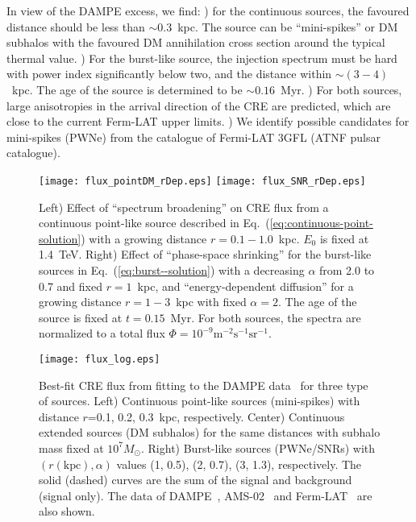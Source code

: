 \documentclass[aps,prl,twocolumn,a4paper]{revtex4}
\newcommand{\eq}[1]{Eq.~(\ref{#1})}
\newcommand{\tx}[1]{\text{#1}}
\begin{document}
In view of the DAMPE excess, we find: 
)
for the continuous sources, 
the favoured distance should be less than $\sim 0.3$~kpc.
The source can be  ``mini-spikes'' or DM subhalos  with 
the favoured DM annihilation cross section around the typical thermal value.
)
For the burst-like source, 
the injection spectrum must be hard with power index significantly below two, and
the distance within $\sim(3-4)$~kpc. 
The age of the source is determined to be $\sim0.16$~Myr.
) 
For both sources,
large anisotropies in the arrival direction of the CRE are predicted,
which are close to the current Ferm-LAT upper limits.
) 
We identify possible candidates for  mini-spikes (PWNe)
from the catalogue of Fermi-LAT  3GFL 
(ATNF pulsar catalogue).
\begin{figure}[thb]
	\centering
	\texttt{[image: flux\_pointDM\_rDep.eps]}
	\texttt{[image: flux\_SNR\_rDep.eps]}
	\caption{		
		Left) 
		Effect of  ``spectrum broadening'' on CRE flux from 
		a continuous point-like source described in 
		\eq{eq:continuous-point-solution} with a growing distance $r=0.1-1.0$~kpc.		 
		$E_{0}$ is fixed at 1.4~TeV.
		Right)
		Effect of ``phase-space shrinking'' for the burst-like sources in 
		\eq{eq:burst--solution} with  a decreasing $\alpha$ from 2.0 to 0.7 and fixed $r=1$~kpc,
		and ``energy-dependent diffusion''  for  a growing  distance $r=1-3$~kpc with fixed $\alpha=2$.
		The age of the source is  fixed at $t=0.15$~Myr.
		For both sources, the spectra are normalized to a total flux
		$\Phi=10^{-9}\mbox{m}^{-2}\mbox{s}^{-1}\mbox{sr}^{-1}$.
	}\label{fig:spectral-feature}
\end{figure}
\begin{figure*}[htb]
	\centering
	\texttt{[image: flux\_log.eps]}
	\caption{
		Best-fit CRE flux from fitting to the DAMPE data~\cite{Chang:2017xx}  
		for three type of sources.
		Left) Continuous point-like sources (mini-spikes) with distance $r$=0.1, 0.2, 0.3~kpc, 				respectively.
		Center) Continuous extended sources (DM subhalos) for the same distances with subhalo
		mass fixed at $10^{7}M_{\odot}$.
		Right) Burst-like sources (PWNe/SNRs) with $(r (\tx{kpc}),\alpha)$ values 
		(1, 0.5), 
		(2, 0.7), 
		(3, 1.3),			
		respectively.	
		The solid (dashed) curves are  the sum of the signal and background (signal only).
		The data of  DAMPE~\cite{Chang:2017xx},
		AMS-02~\cite{Aguilar:2014fea} and
		Ferm-LAT~\cite{Abdollahi:2017nat} 
		are also shown.
	}\label{fig:flux}  
\end{figure*}
\end{document}
